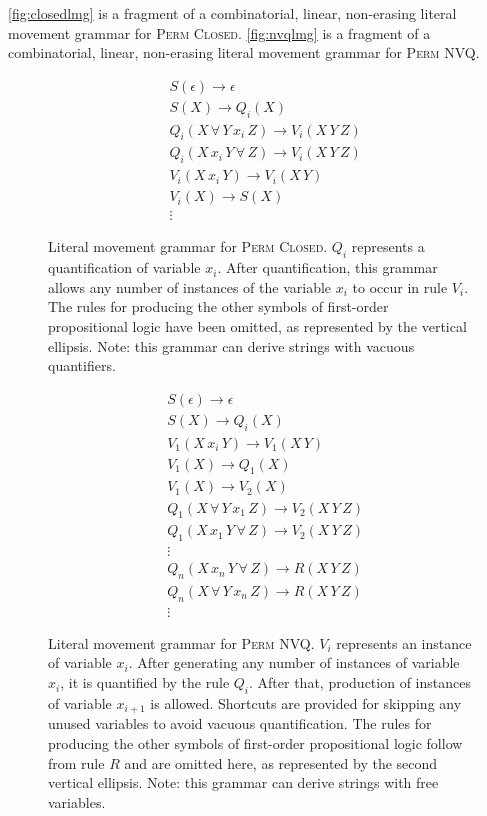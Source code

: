 \documentclass{article}
\theoremstyle{definition}
\newcommand{\pc}{\textsc{Perm Closed}}
\newcommand{\pn}{\textsc{Perm NVQ}}
\begin{document}
\autoref{fig:closedlmg} is a fragment of a combinatorial, linear, non-erasing literal movement grammar for \pc.
\autoref{fig:nvqlmg} is a fragment of a combinatorial, linear, non-erasing literal movement grammar for \pn.

\begin{figure}
  \caption{
    \label{fig:closedlmg}
    Literal movement grammar for \pc.
    $Q_i$ represents a quantification of variable $x_i$.
    After quantification, this grammar allows any number of instances of the variable $x_i$ to occur in rule $V_i$.
    The rules for producing the other symbols of first-order propositional logic have been omitted, as represented by the vertical ellipsis.
    Note: this grammar can derive strings with vacuous quantifiers.
  }
  \begin{align*}
    & S(\epsilon) \rightarrow \epsilon \\
    & S(X) \rightarrow Q_i(X) \\
    & Q_i(X \, \forall \, Y \, x_i \, Z) \rightarrow V_i(X \, Y \, Z) \\
    & Q_i(X \, x_i \, Y \, \forall \, Z) \rightarrow V_i(X\, Y \, Z) \\
    & V_i(X \, x_i \, Y) \rightarrow V_i(X \, Y) \\
    & V_i(X) \rightarrow S(X) \\
    & \vdots
  \end{align*}
\end{figure}

\begin{figure}
  \caption{
    \label{fig:nvqlmg}
    Literal movement grammar for \pn.
    $V_i$ represents an instance of variable $x_i$.
    After generating any number of instances of variable $x_i$, it is quantified by the rule $Q_i$.
    After that, production of instances of variable $x_{i+1}$ is allowed.
    Shortcuts are provided for skipping any unused variables to avoid vacuous quantification.
    The rules for producing the other symbols of first-order propositional logic follow from rule $R$ and are omitted here, as represented by the second vertical ellipsis.
    Note: this grammar can derive strings with free variables.
  }
  \begin{align*}
    & S(\epsilon) \rightarrow \epsilon \\
    & S(X) \rightarrow Q_i(X) \\
    & V_1(X \, x_i \, Y) \rightarrow V_1(X \, Y) \\
    & V_1(X) \rightarrow Q_1(X) \\
    & V_1(X) \rightarrow V_2(X) \\
    & Q_1(X \, \forall \, Y \, x_1 \, Z) \rightarrow V_2(X \, Y \, Z) \\
    & Q_1(X \, x_1 \, Y \, \forall \, Z) \rightarrow V_2(X \, Y \, Z) \\
    & \vdots \\
    & Q_n(X \, x_n \, Y \, \forall \, Z) \rightarrow R(X \, Y \, Z) \\
    & Q_n(X \, \forall \,  Y \, x_n \, Z) \rightarrow R(X \, Y \, Z) \\
    & \vdots
  \end{align*}
\end{figure}
\end{document}
